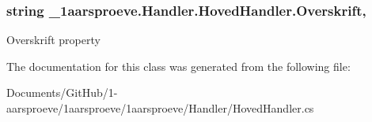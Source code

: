\subsubsection[{Overskrift}]{\setlength{\rightskip}{0pt plus 5cm}string \+\_\+1aarsproeve.\+Handler.\+Hoved\+Handler.\+Overskrift\hspace{0.3cm}{\ttfamily [get]}, {\ttfamily [set]}}\label{class__1aarsproeve_1_1_handler_1_1_hoved_handler_a325c1c3209bf296a54e71cf0ed1212a8}


Overskrift property 



The documentation for this class was generated from the following file\+:\begin{DoxyCompactItemize}
\item 
Documents/\+Git\+Hub/1-\/aarsproeve/1aarsproeve/1aarsproeve/\+Handler/Hoved\+Handler.\+cs\end{DoxyCompactItemize}
